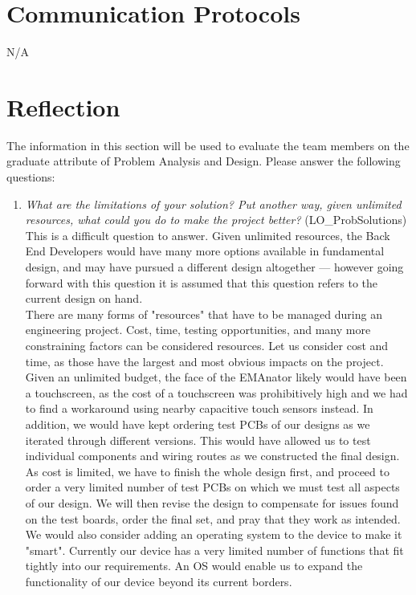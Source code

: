 \documentclass[12pt, titlepage]{article}
\begin{document}
\section{Communication Protocols}

N/A

\section{Reflection}

The information in this section will be used to evaluate the team members on the
graduate attribute of Problem Analysis and Design.  Please answer the following questions:

\begin{enumerate}
  \item \textit{What are the limitations of your solution?  Put another way, given
  unlimited resources, what could you do to make the project better? }(LO\_ProbSolutions)\\

This is a difficult question to answer. Given unlimited resources, the Back End Developers would have many more options available in fundamental design, and may have pursued a different design altogether --- however going forward with this question it is assumed that this question refers to the current design on hand.\\

There are many forms of "resources" that have to be managed during an engineering project. Cost, time, testing opportunities, and many more constraining factors can be considered resources. Let us consider cost and time, as those have the largest and most obvious impacts on the project.\\

Given an unlimited budget, the face of the EMAnator likely would have been a touchscreen, as the cost of a touchscreen was prohibitively high and we had to find a workaround using nearby capacitive touch sensors instead. In addition, we would have kept ordering test PCBs of our designs as we iterated through different versions. This would have allowed us to test individual components and wiring routes as we constructed the final design. As cost is limited, we have to finish the whole design first, and proceed to order a very limited number of test PCBs on which we must test all aspects of our design. We will then revise the design to compensate for issues found on the test boards, order the final set, and pray that they work as intended. We would also consider adding an operating system to the device to make it "smart". Currently our device has a very limited number of functions that fit tightly into our requirements. An OS would enable us to expand the functionality of our device beyond its current borders.\\


\end{enumerate}
\end{document}
